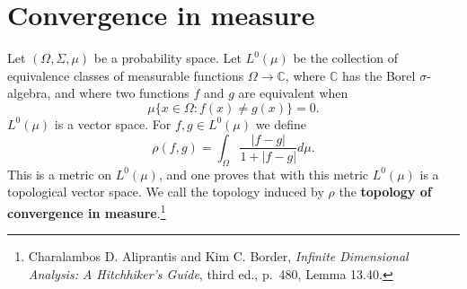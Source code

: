 \documentclass{article}
\theoremstyle{definition}
\begin{document}
\section{Convergence in measure}
Let $(\Omega,\Sigma,\mu)$ be a probability space.
Let $L^0(\mu)$ be the collection of equivalence classes of
measurable functions 
$\Omega \to \mathbb{C}$, where $\mathbb{C}$ has the Borel $\sigma$-algebra, and where two functions $f$ and $g$ are equivalent when
\[
\mu\{x \in \Omega: f(x) \neq g(x)\} = 0.
\]
$L^0(\mu)$ is a vector space. 
For $f,g \in L^0(\mu)$ we define
\[
\rho(f,g) = \int_\Omega \frac{|f-g|}{1+|f-g|}  d\mu.
\]
This is a metric on $L^0(\mu)$, and one proves that with this metric $L^0(\mu)$ is a topological vector space. We call the topology
induced by $\rho$ the \textbf{topology of convergence in measure}.\footnote{Charalambos D. 
Aliprantis and Kim C. Border, {\em Infinite Dimensional Analysis: A Hitchhiker's Guide}, third ed., p.~480,
Lemma 13.40.} 
\end{document}
